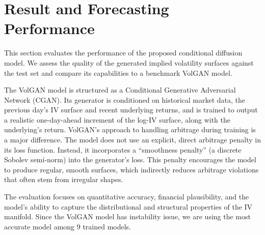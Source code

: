 \documentclass{article}
\begin{document}
\section{Result and Forecasting Performance}
\label{sec:performance}

This section evaluates the performance of the proposed conditional diffusion model. We assess the quality of the generated implied volatility surfaces against the test set and compare its capabilities to a benchmark VolGAN model. 

The VolGAN model is structured as a Conditional Generative Adversarial Network (CGAN). Its generator is conditioned on historical market data, the previous day's IV surface and recent underlying returns, and is trained to output a realistic one-day-ahead increment of the log-IV surface, along with the underlying's return. VolGAN's approach to handling arbitrage during training is a major difference. The model does not use an explicit, direct arbitrage penalty in its loss function. Instead, it incorporates a ``smoothness penalty'' (a discrete Sobolev semi-norm) into the generator's loss. This penalty encourages the model to produce regular, smooth surfaces, which indirectly reduces arbitrage violations that often stem from irregular shapes.

The evaluation focuses on quantitative accuracy, financial plausibility, and the model's ability to capture the distributional and structural properties of the IV manifold. Since the VolGAN model has instability issue, we are using the most accurate model among 9 trained models.
\end{document}
